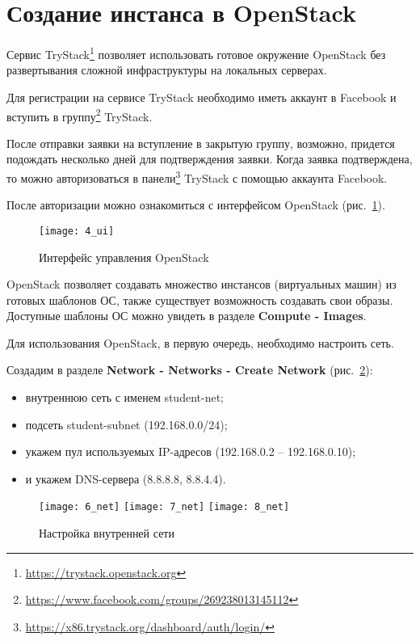 \section{Создание инстанса в OpenStack} \label{pril:f}

Сервис TryStack\footnote{\url{https://trystack.openstack.org}} позволяет использовать готовое окружение OpenStack без развертывания сложной инфраструктуры на локальных серверах.

Для регистрации на сервисе TryStack необходимо иметь аккаунт в Facebook и вступить в группу\footnote{\url{https://www.facebook.com/groups/269238013145112}} TryStack.

После отправки заявки на вступление в закрытую группу, возможно, придется подождать несколько дней для подтверждения заявки.
Когда заявка подтверждена, то можно авторизоваться в панели\footnote{\url{https://x86.trystack.org/dashboard/auth/login/}} TryStack с помощью аккаунта Facebook.

После авторизации можно ознакомиться с интерфейсом OpenStack (рис.~\ref{pic:ui}).
\begin{figure}[ht]
    \centering
    \texttt{[image: 4\_ui]}
    \caption{Интерфейс управления OpenStack}\label{pic:ui}
\end{figure}

OpenStack позволяет создавать множество инстансов (виртуальных машин) из готовых шаблонов ОС, также существует возможность создавать свои образы.
Доступные шаблоны ОС можно увидеть в разделе \textbf{Compute - Images}.

Для использования OpenStack, в первую очередь, необходимо настроить сеть.

Создадим в разделе \textbf{Network - Networks - Create Network} (рис.~\ref{pic:net}):
\begin{itemize}
    \item внутреннюю сеть с именем student-net;
    \item подсеть student-subnet (192.168.0.0/24);
    \item укажем пул используемых IP-адресов (192.168.0.2 -- 192.168.0.10);
    \item и укажем DNS-сервера (8.8.8.8, 8.8.4.4).
\end{itemize}

\begin{figure}[ht]
    \centering
    \texttt{[image: 6\_net]}
    \texttt{[image: 7\_net]}
    \texttt{[image: 8\_net]}
    \caption{Настройка внутренней сети}\label{pic:net}
\end{figure}

